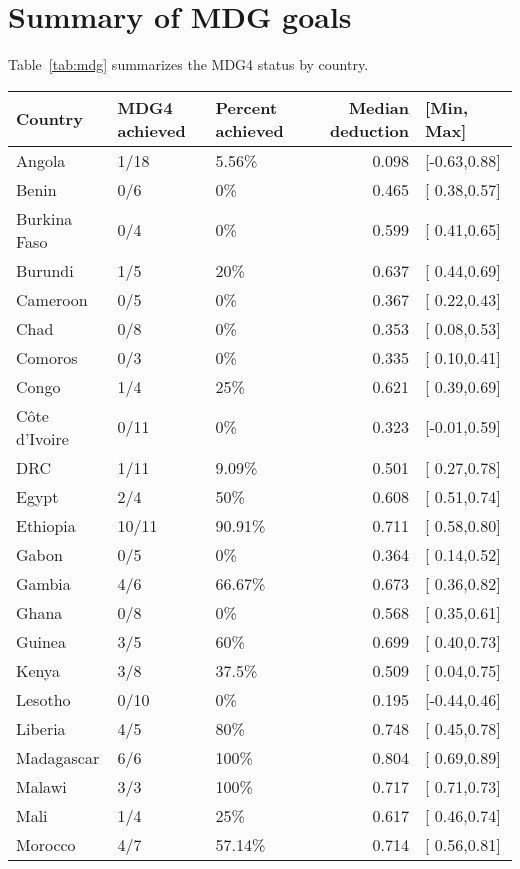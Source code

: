 \documentclass[12pt]{article}\usepackage[]{graphicx}\usepackage[]{color}
\begin{document}
\section{Summary of MDG goals}
Table~\ref{tab:mdg} summarizes the MDG4 status by country.
\begin{table}[ht]
\centering
\begin{tabular}{lllrl}
  \hline
Country & MDG4 achieved & Percent achieved & Median deduction & [Min, Max] \\ 
   \hline
Angola & 1/18 & 5.56\% & 0.098 & [-0.63,0.88] \\ 
  Benin & 0/6 & 0\% & 0.465 & [ 0.38,0.57] \\ 
  Burkina Faso & 0/4 & 0\% & 0.599 & [ 0.41,0.65] \\ 
  Burundi & 1/5 & 20\% & 0.637 & [ 0.44,0.69] \\ 
  Cameroon & 0/5 & 0\% & 0.367 & [ 0.22,0.43] \\ 
  Chad & 0/8 & 0\% & 0.353 & [ 0.08,0.53] \\ 
  Comoros & 0/3 & 0\% & 0.335 & [ 0.10,0.41] \\ 
  Congo & 1/4 & 25\% & 0.621 & [ 0.39,0.69] \\ 
  C\^{o}te d'Ivoire & 0/11 & 0\% & 0.323 & [-0.01,0.59] \\ 
  DRC & 1/11 & 9.09\% & 0.501 & [ 0.27,0.78] \\ 
  Egypt & 2/4 & 50\% & 0.608 & [ 0.51,0.74] \\ 
  Ethiopia & 10/11 & 90.91\% & 0.711 & [ 0.58,0.80] \\ 
  Gabon & 0/5 & 0\% & 0.364 & [ 0.14,0.52] \\ 
  Gambia & 4/6 & 66.67\% & 0.673 & [ 0.36,0.82] \\ 
  Ghana & 0/8 & 0\% & 0.568 & [ 0.35,0.61] \\ 
  Guinea & 3/5 & 60\% & 0.699 & [ 0.40,0.73] \\ 
  Kenya & 3/8 & 37.5\% & 0.509 & [ 0.04,0.75] \\ 
  Lesotho & 0/10 & 0\% & 0.195 & [-0.44,0.46] \\ 
  Liberia & 4/5 & 80\% & 0.748 & [ 0.45,0.78] \\ 
  Madagascar & 6/6 & 100\% & 0.804 & [ 0.69,0.89] \\ 
  Malawi & 3/3 & 100\% & 0.717 & [ 0.71,0.73] \\ 
  Mali & 1/4 & 25\% & 0.617 & [ 0.46,0.74] \\ 
  Morocco & 4/7 & 57.14\% & 0.714 & [ 0.56,0.81] \\ 

\end{tabular}
\end{table}
\end{document}
